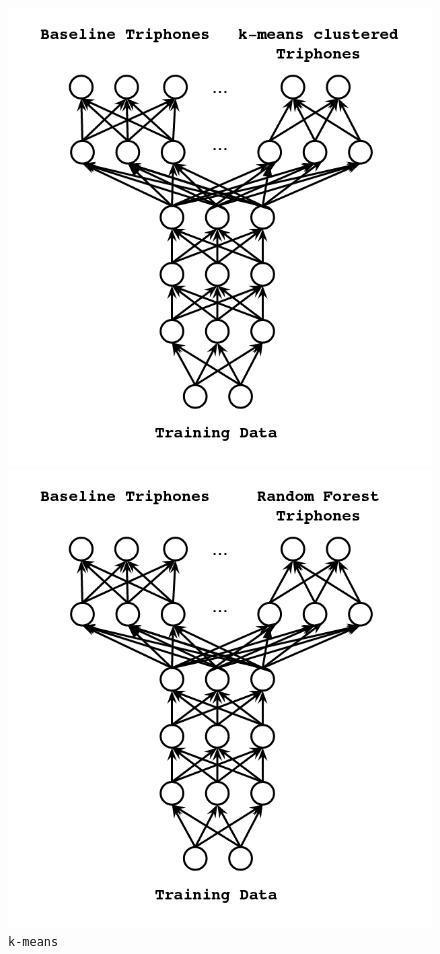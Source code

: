 \documentclass[10pt,a4paper]{article}
\begin{document}
\begin{enumerate}
\begin{figure}[!htb]
  \includegraphics[width=\linewidth]{figs/mtl-arch-kMeans.png}
  \caption{\texttt{k-means}}
\endminipage\hfill
{}
  \includegraphics[width=\linewidth]{figs/mtl-arch-forest.png}

\end{figure}
\end{enumerate}
\end{document}
